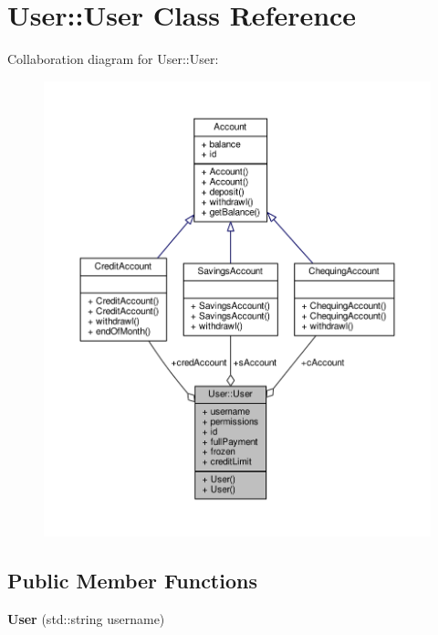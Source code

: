 \hypertarget{classUser_1_1User}{\section{User\-:\-:User Class Reference}
\label{classUser_1_1User}
}


Collaboration diagram for User\-:\-:User\-:
\nopagebreak
\begin{figure}[H]
\begin{center}
\leavevmode
\includegraphics[width=350pt]{classUser_1_1User__coll__graph}
\end{center}
\end{figure}
\subsection*{Public Member Functions}
\begin{DoxyCompactItemize}
\item 
\hypertarget{classUser_1_1User_a8446d605c24cb948704c55b050b9bec8}{{\bfseries User} (std\-::string username)}\label{classUser_1_1User_a8446d605c24cb948704c55b050b9bec8}

\end{DoxyCompactItemize}
